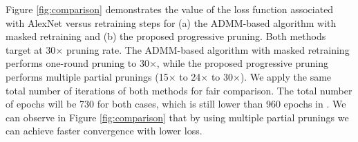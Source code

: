 \documentclass{article} %
\begin{document}




Figure \ref{fig:comparison} demonstrates the value of the loss function associated with AlexNet versus retraining steps for (a) the ADMM-based algorithm with masked retraining and (b) the proposed progressive pruning. Both methods target at 30$\times$ pruning rate. The ADMM-based algorithm with masked retraining performs one-round pruning to 30$\times$, while the proposed progressive pruning performs multiple partial prunings (15$\times$ to 24$\times$ to 30$\times$). We apply the same total number of iterations of both methods for fair comparison. The total number of epochs will be 730 for both cases, which is still lower than 960 epochs in \citep{han2015deep}. We can observe in Figure \ref{fig:comparison} that by using multiple partial prunings we can achieve faster convergence with lower loss. 










\end{document}

